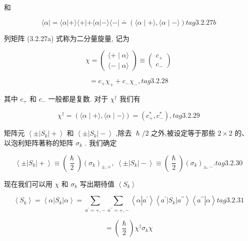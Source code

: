 和

$$
\langle \alpha \left| { = \langle \alpha }\right| + \rangle \langle + \left| {+\langle \alpha }\right| - \rangle \langle - | \doteq \left( {\langle \alpha \mid + \rangle ,\langle \alpha \mid - \rangle }\right) tag{3.2.27b}
$$

列矩阵 (3.2.27a) 式称为二分量旋量, 记为

$$
\chi = \left( \begin{array}{l} \langle + \mid \alpha \rangle \\ \langle - \mid \alpha \rangle \end{array}\right) \equiv \left( \begin{array}{l} {c}_{ + } \\ {c}_{ - } \end{array}\right)
$$

$$
= {c}_{ + }{\chi }_{ + } + {c}_{ - }{\chi }_{ - }, tag{3.2.28}
$$


其中 ${c}_{ + }$ 和 ${c}_{ - }$ 一般都是复数. 对于 ${\chi }^{ \dagger }$ 我们有

$$
{\chi }^{ \dagger } = \left( {\langle \alpha \mid + \rangle ,\langle \alpha \mid - \rangle }\right) = \left( {{c}_{ + }^{ * },{c}_{ - }^{ * }}\right) , tag{3.2.29}
$$

矩阵元 $\left\langle {\pm \left| {S}_{k}\right| + }\right\rangle$ 和 $\left\langle {\pm \left| {S}_{k}\right| - }\right\rangle$ ,除去 $\hslash /2$ 之外,被设定等于那些 $2 \times 2$ 的、以泡利矩阵著称的矩阵 ${\sigma }_{k}$ . 我们确定

$$
\left\langle {\pm \left| {S}_{k}\right| + }\right\rangle \equiv \left( \frac{\hslash }{2}\right) {\left( {\sigma }_{k}\right) }_{\pm , + },\;\left\langle {\pm \left| {S}_{k}\right| - }\right\rangle \equiv \left( \frac{\hslash }{2}\right) {\left( {\sigma }_{k}\right) }_{\pm , - }. tag{3. 2.30}
$$

现在我们可以用 $\chi$ 和 ${\sigma }_{k}$ 写出期待值 $\left\langle {S}_{k}\right\rangle$

$$
\left\langle {S}_{k}\right\rangle = \left\langle {\alpha \left| {S}_{k}\right| \alpha }\right\rangle = \mathop{\sum }\limits_{{{a}^{\prime } = + , - }}\mathop{\sum }\limits_{{{a}^{\prime \prime } = + , - }}\left\langle {\alpha \left| {a}^{\prime }\right\rangle \left\langle {{a}^{\prime }\left| {S}_{k}\right| {a}^{\prime \prime }}\right\rangle \left\langle {a}^{\prime \prime }\right| \alpha }\right\rangle tag{3. 2.31}
$$

$$
= \left( \frac{\hslash }{2}\right) {\chi }^{ \dagger }{\sigma }_{k}\chi
$$

